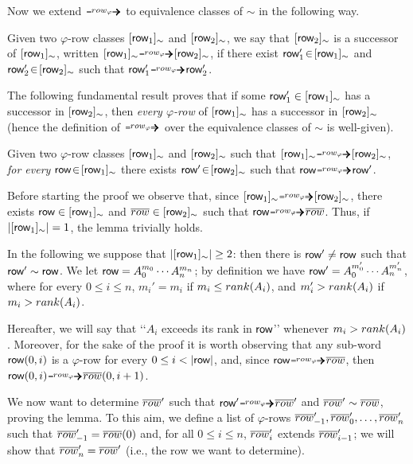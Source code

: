 Now we extend $\rownext$ to equivalence classes of $\sim$ in the following way. 
%
\begin{definition}\label{def:row_class_suc}
Given two $\varphi$-row
classes $[\text{{\sffamily row}}_1]_\sim$ and $[\text{{\sffamily row}}_2]_\sim$, we say that $[\text{{\sffamily row}}_2]_\sim$ is a successor of  $[\text{{\sffamily row}}_1]_\sim$, 
written $[\row_1]_\sim\rownext [\row_2]_\sim$, if there exist 
$\text{{\sffamily row}}_1' \!\in\! [\text{{\sffamily row}}_1]_\sim$ and $\text{{\sffamily row}}_2' \!\in\!  [\text{{\sffamily row}}_2]_\sim$ such that 
$\row_1' \rownext \row_2'$.
\end{definition}

The following fundamental result proves that if some $\text{{\sffamily row}}_1' \in [\text{{\sffamily row}}_1]_\sim$ has a successor in $[\text{{\sffamily row}}_2]_\sim$, %
then \emph{every $\varphi$-row} of $[\text{{\sffamily row}}_1]_\sim$ has a successor in $[\text{{\sffamily row}}_2]_\sim$ (hence the definition of $\rownext$ over the equivalence classes of $\sim$ is well-given). 

%
\begin{lemma}\label{lem:row_class_suc}
Given two $\varphi$-row
classes $[\text{{\sffamily row}}_1]_\sim$ and $[\text{{\sffamily row}}_2]_\sim$ such that 
$[\row_1]_\sim\rownext [\row_2]_\sim$, \emph{for every} $\text{{\sffamily row}}\!\in\! [\text{{\sffamily row}}_1]_\sim$ there exists 
$\text{{\sffamily row}}'\!\in\! [\text{{\sffamily row}}_2]_\sim$ such that $\row\rownext \row'$.
\end{lemma}

Before starting the proof we observe that,
since $[\row_1]_\sim
\rownext [\row_2]_\sim$, 
there exists $\text{{\sffamily row}} \in [\text{{\sffamily row}}_1]_\sim$
and $\overline{row}\in [\text{{\sffamily row}}_2]_\sim$ such that $\row \rownext \orow$. Thus, if $|[\text{{\sffamily row}}_1]_\sim|=1$, 
the lemma trivially holds. 

In the following we suppose that $|[\text{{\sffamily row}}_1]_\sim|\geq 2$: then there is $\text{{\sffamily row}}' \neq \text{{\sffamily row}}$ such that 
$\text{{\sffamily row}}' \sim \text{{\sffamily row}}$. We let $\text{{\sffamily row}} = A_0^{m_0}\cdots A_n^{m_n}$; by definition we have
$\text{{\sffamily row}}' =A_0^{m_0'}\cdots A_n^{m_n'}$, where for every $0\leq i \leq n$,
$m_i'= m_i$ if  $m_i\leq rank(A_i)$, and $m_i'> rank(A_i)$ if $m_i > rank(A_i)$.

Hereafter, we will say that \lq\lq $A_i$ exceeds its rank in $\text{{\sffamily row}}$\rq\rq{}
whenever $m_i> rank(A_i)$.
Moreover, for the sake of the proof it is worth observing that any sub-word $\text{{\sffamily row}}(0, i)$ is a $\varphi$-row for every $0\leq i < |\text{{\sffamily row}}|$, and, 
since $\row\rownext \orow$, then $\row(0, i)\rownext \orow(0, i+1)$.
 
We now want to determine 
$\overline{row}'$ such that 
$\row' \rownext \orow' $  and $\overline{row}'\sim \overline{row}$, proving the lemma.
%
To this aim, we define a list of $\varphi$-rows $\overline{row}'_{-1}, \overline{row}'_0,\ldots ,\overline{row}'_n$ such that
$\overline{row}'_{-1}=\overline{row}(0)$ and,
for all $0\leq i\leq n$, $\overline{row}'_i$ extends $\overline{row}'_{i-1}$; we will show that $\overline{row}'_n=\overline{row}'$ (i.e., the row we want to determine).

